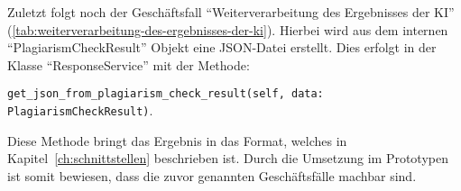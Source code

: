 Zuletzt folgt noch der Geschäftsfall ``Weiterverarbeitung des Ergebnisses der KI'' (\ref{tab:weiterverarbeitung-des-ergebnisses-der-ki}).
Hierbei wird aus dem internen ``PlagiarismCheckResult'' Objekt eine JSON-Datei erstellt.
Dies erfolgt in der Klasse ``ResponseService'' mit der Methode:

\texttt{get\_json\_from\_plagiarism\_check\_result(self, data: PlagiarismCheckResult)}.

Diese Methode bringt das Ergebnis in das Format, welches in Kapitel~\ref{ch:schnittstellen} beschrieben ist.
Durch die Umsetzung im Prototypen ist somit bewiesen, dass die zuvor genannten Geschäftsfälle machbar sind.